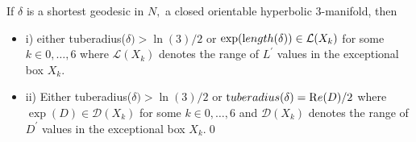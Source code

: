 \begin{corollary}\label{GMT 1.29}
If $\delta$ is a shortest geodesic in $N,$ a closed orientable
hyperbolic $3$\/{\textrm -}\/manifold{\textrm ,} then 
\begin{itemize}
\item{i)}  either {\textrm tuberadius(}$\delta) > \ln(3)/2$ or
$\exp({\textrm length}(\delta))\in {\mathcal L}(X_k)$ for some\break $k\in {0,\ldots,6}$
 where ${\mathcal L}(X_k)$
denotes the range of $L^\prime$ values in the 
exceptional box $X_k.$ 

\item{ii)} Either {\textrm tuberadius(}$\delta) > \ln(3)/2$ or
${\textrm tuberadius}(\delta) = {\mathrm Re}(D)/2$ where\break $\exp(D)
\in {\mathcal D}(X_k)$ for some $k\in {0,\ldots,6}$
 and ${\mathcal D}(X_k)$
denotes the range of $D^\prime$ values in the 
exceptional box $X_k.$\hfill\qed
\end{itemize}

\end{corollary}

